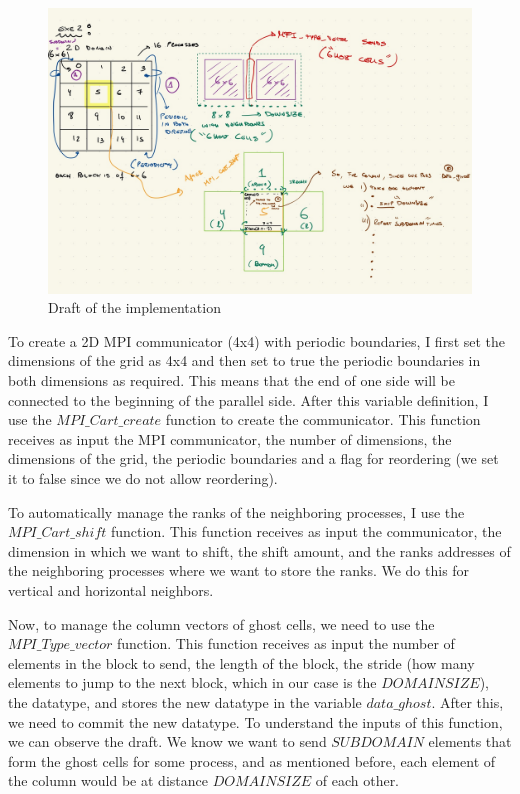 \documentclass[unicode,11pt,a4paper,oneside,numbers=endperiod,openany]{scrartcl}
\begin{document}
\begin{figure}[H]
    \centering
    \includegraphics[width=\textwidth]{./img/exe2/draft.jpeg}
    \caption{Draft of the implementation}
  \end{figure}


To create a 2D MPI communicator (4x4) with periodic boundaries, I first set the dimensions of the grid as 4x4 and then set to true the periodic boundaries in both dimensions as required. 
This means that the end of one side will be connected to the beginning of the parallel side. After this variable definition, I use the $MPI\_Cart\_create$ function to create the communicator.
This function receives as input the MPI communicator, the number of dimensions, the dimensions of the grid, the periodic boundaries and a flag for reordering (we set it to false since we do not allow reordering).

To automatically manage the ranks of the neighboring processes, I use the $MPI\_Cart\_shift$ function. This function receives as input the communicator, the dimension in which we want to shift, the shift amount, and the ranks addresses 
of the neighboring processes where we want to store the ranks. We do this for vertical and horizontal neighbors.

Now, to manage the column vectors of ghost cells, we need to use the $MPI\_Type\_vector$ function. This function receives as input the number of elements in the block to send, the length of the block, the stride (how many elements to jump to the next block, which in our case 
is the $DOMAINSIZE$), the datatype, and stores the new datatype in the variable $data\_ghost$. After this, we need to commit the new datatype.
To understand the inputs of this function, we can observe the draft. We know we want to send $SUBDOMAIN$ elements that form the ghost cells for some process,
and as mentioned before, each element of the column would be at distance $DOMAINSIZE$ of each other. 
\end{document}
